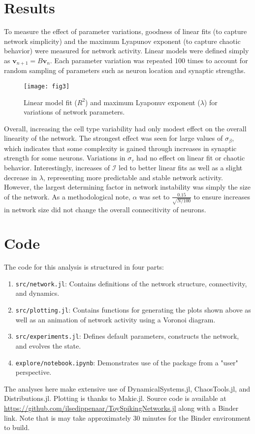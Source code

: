 \documentclass[12pt]{article}
\begin{document}
\section{Results}
To measure the effect of parameter variations, goodness of linear fits (to capture network simplicity) and the maximum Lyapunov exponent (to capture chaotic behavior) were measured for network activity. Linear models were defined simply as $\mathbf{v}_{n+1}=B\mathbf{v}_{n}$. Each parameter variation was repeated 100 times to account for random sampling of parameters such as neuron location and synaptic strengths.

\begin{figure}[h]
\centering
\texttt{[image: fig3]}
\caption{Linear model fit ($R^2$) and maximum Lyaponuv exponent ($\lambda$) for variations of network parameters.}
\label{fig:3}
\end{figure}

Overall, increasing the cell type variability had only modest effect on the overall linearity of the network. The strongest effect was seen for large values of $\sigma_\beta$, which indicates that some complexity is gained through increases in synaptic strength for some neurons. Variations in $\sigma_\tau$ had no effect on linear fit or chaotic behavior. Interestingly, increases of $\mathcal{I}$ led to better linear fits as well as a slight decrease in $\lambda$, representing more predictable and stable network activity. However, the largest determining factor in network instability was simply the size of the network. As a methodological note, $\alpha$ was set to $\frac{0.15}{\sqrt{N/100}}$ to ensure increases in network size did not change the overall connecitivity of neurons.

\section{Code}
The code for this analysis is structured in four parts:
\begin{enumerate}
\item \texttt{src/network.jl}: Contains definitions of the network structure, connectivity, and dynamics.
\item \texttt{src/plotting.jl}: Contains functions for generating the plots shown above as well as an animation of network activity using a Voronoi diagram.
\item \texttt{src/experiments.jl}: Defines default parameters, constructs the network, and evolves the state.
\item \texttt{explore/notebook.ipynb}: Demonstrates use of the package from a "user" perspective.
\end{enumerate}

The analyses here make extensive use of DynamicalSystems.jl, ChaosTools.jl, and Distributions.jl. Plotting is thanks to Makie.jl. Source code is available at \url{https://github.com/ilsedippenaar/ToySpikingNetworks.jl} along with a Binder link. Note that is may take approximately 30 minutes for the Binder environment to build.
\end{document}
